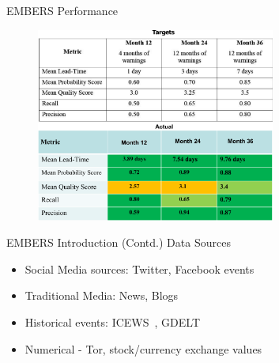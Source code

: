 \begin{frame}{EMBERS Performance}
\begin{figure}
    \centering
    \includegraphics[width=0.7\textwidth]{Problem1/figures/performance_tb1.pdf}
    \label{fig:my_label}
\end{figure}
\end{frame}

\begin{frame}{EMBERS Introduction (Contd.)}
    Data Sources
    \begin{itemize}
        \item Social Media sources: Twitter, Facebook events
        \item Traditional Media: News, Blogs
        \item Historical events: ICEWS~\cite{boschee2015icews}, GDELT~\cite{leetaru2013gdelt}
        \item Numerical - Tor, stock/currency exchange values
    \end{itemize}
    
\end{frame}

